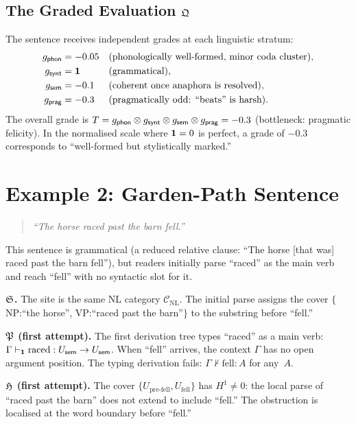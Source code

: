 \subsection{The Graded Evaluation $\mathfrak{Q}$}

The sentence receives independent grades at each linguistic stratum:
\begin{align*}
  g_{\mathsf{phon}}  &= -0.05  &&\text{(phonologically well-formed, minor coda cluster)},\\
  g_{\mathsf{synt}}  &= \mathbf{1}   &&\text{(grammatical)},\\
  g_{\mathsf{sem}}   &= -0.1   &&\text{(coherent once anaphora is resolved)},\\
  g_{\mathsf{prag}}  &= -0.3   &&\text{(pragmatically odd: ``beats'' is harsh)}.
\end{align*}
The overall grade is
$T = g_{\mathsf{phon}}\otimes g_{\mathsf{synt}}\otimes g_{\mathsf{sem}}\otimes g_{\mathsf{prag}}
   = -0.3$
(bottleneck: pragmatic felicity).
In the normalised scale where $\mathbf{1}=0$ is perfect, a grade of
$-0.3$ corresponds to ``well-formed but stylistically marked.''

\medskip

\section{Example 2: Garden-Path Sentence}
\label{sec:garden-path}

\begin{quote}
\emph{``The horse raced past the barn fell.''}
\end{quote}

This sentence is grammatical (a reduced relative clause:
``The horse [that was] raced past the barn fell''),
but readers initially parse ``raced'' as the main verb and
reach ``fell'' with no syntactic slot for it.

\textbf{$\mathfrak{S}$.}\quad
The site is the same NL category $\mathcal{C}_{\mathrm{NL}}$.
The initial parse assigns the cover
$\{$NP:``the horse'', VP:``raced past the barn''$\}$
to the substring before ``fell.''

\textbf{$\mathfrak{P}$ (first attempt).}\quad
The first derivation tree types ``raced'' as a main verb:
$\Gamma\vdash_{\mathbf{1}}\text{raced}:U_{\mathsf{sem}}\to U_{\mathsf{sem}}$.
When ``fell'' arrives, the context $\Gamma$ has no open
argument position.  The typing derivation fails:
$\Gamma\nvdash\text{fell}:A$ for any~$A$.

\textbf{$\mathfrak{H}$ (first attempt).}\quad
The cover $\{U_{\text{pre-fell}}, U_{\text{fell}}\}$ has
$H^1\neq 0$: the local parse of ``raced past the barn'' does not
extend to include ``fell.''  The obstruction is localised at the
word boundary before ``fell.''

